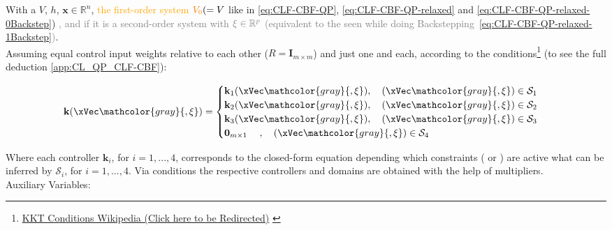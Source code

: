 With a  \(V\),  \(h\), \(\mathbf{x}\in\mathbb{R}^n\), \textcolor{orange}{the first-order system } \(\mathcolor{orange}{V_0} ( = V\) like in \ref{eq:CLF-CBF-QP}, \ref{eq:CLF-CBF-QP-relaxed} and \ref{eq:CLF-CBF-QP-relaxed-0Backstep}) \textcolor{gray}{, and if it is a second-order system with} \(\mathcolor{gray}{\mathbf{\xi}\in\mathbb{R}^p}\) \textcolor{gray}{(equivalent to the  seen while doing Backstepping~\ref{eq:CLF-CBF-QP-relaxed-1Backstep})}. \\


Assuming equal control input weights relative to each other (\(R = \mathbf{I}_{m \times m}\)) and just one  and  each, according to the  conditions\footnote{\href{https://en.wikipedia.org/wiki/Karush-Kuhn-Tucker_conditions}{KKT Conditions Wikipedia (Click here to be Redirected)} \label{foot: KKT_Conditions}} (to see the full deduction \ref{app:CL_QP_CLF-CBF}):

\begin{equation}
    \mathbf{k}(\xVec \mathcolor{gray}{, \mathbf{\xi}}) =
    \begin{cases}
        \mathbf{k}_1(\xVec \mathcolor{gray}{, \mathbf{\xi}}), \quad (\xVec \mathcolor{gray}{, \mathbf{\xi}}) \in \mathcal{S}_1 \\
        \mathbf{k}_2(\xVec \mathcolor{gray}{, \mathbf{\xi}}), \quad (\xVec \mathcolor{gray}{, \mathbf{\xi}}) \in \mathcal{S}_2 \\
        \mathbf{k}_3(\xVec \mathcolor{gray}{, \mathbf{\xi}}), \quad (\xVec \mathcolor{gray}{, \mathbf{\xi}}) \in \mathcal{S}_3 \\
        \mathbf{0}_{m \times 1 } \quad  \hspace{0.25em}, \quad (\xVec \mathcolor{gray}{, \mathbf{\xi}}) \in \mathcal{S}_4
    \end{cases}
    \label{eq:closed-form_controller}
\end{equation}


Where each controller \(\mathbf{k}_i\), for \( i = 1, ..., 4 \), corresponds to the closed-form equation depending which constraints ( or ) are active what can be inferred by \(\mathcal{S}_i\), for \( i = 1, ..., 4 \). Via  conditions the respective  controllers and domains are obtained with the help of  multipliers.\\

Auxiliary Variables:

